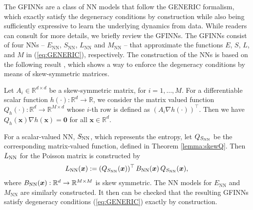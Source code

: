\documentclass[final]{siamltex}
\newcommand{\bfa}[1]{\boldsymbol{#1}}
\begin{document}
The GFINNs \cite{zhang2022gfinns} are a class of NN models that follow the GENERIC formalism, which exactly satisfy the degeneracy conditions by construction while also being sufficiently expressive to learn the underlying dynamics from data.
While readers can consult \cite{zhang2022gfinns} for more details, we briefly review the GFINNs.
The GFINNs consist of four NNs -- $E_{\text{NN}}$, $S_{\text{NN}}$, $L_{\text{NN}}$ and $M_{\text{NN}}$ -- that approximate the functions $E$, $S$, $L$, and $M$ in (\ref{eq:GENERIC}), respectively.
The construction of the NNs is based on the following result \cite[Lemma 3.6]{zhang2022gfinns}, which shows a way to enforce the degeneracy conditions by means of skew-symmetric matrices.
\begin{theorem}\label{lemma:skewQ}
Let $A_i \in \mathbb{R}^{d\times d}$ be a skew-symmetric matrix, for $i = 1,\dots, M$. For a differentiable scalar function $h(\cdot): \mathbb{R}^{d} \to \mathbb{R}$, we 
consider the matrix valued function $Q_h(\cdot): \mathbb{R}^{d} \to \mathbb{R}^{M \times d}$ whose $i$-th row is defined as $(A_i \nabla h(\cdot))^\top$. Then we have $Q_h(\bfa{x}) \nabla h(\bfa{x}) = \bfa{0}$ for all $\bfa{x} \in \mathbb{R}^{d}$. 
\end{theorem}

For a scalar-valued NN, $S_{\textnormal{NN}}$, which represents the entropy,
let $Q_{S_{\textnormal{NN}}}$ be the corresponding matrix-valued function, defined in Theorem \ref{lemma:skewQ}.
Then $L_{\textnormal{NN}}$ for the Poisson matrix is constructed by 
\begin{equation*}
\label{eq:ann_structure}
L_{\textnormal{NN}}(\bfa{x}) := (Q_{S_{\textnormal{NN}}}(\bfa{x}))^\top \, B_{\textnormal{NN}}(\bfa{x}) \, Q_{S_{\textnormal{NN}}}(\bfa{x}),
\end{equation*}
where $B_{\textnormal{NN}}(\bfa{x}): \mathbb{R}^{d} \to  \mathbb{R}^{M \times M}$ is skew symmetric.
The NN models for $E_{\text{NN}}$ and $M_{\text{NN}}$ are similarly constructed.
It then can be checked that the resulting GFINNs satisfy degeneracy conditions (\ref{eq:GENERIC}) exactly by construction. 
\end{document}

